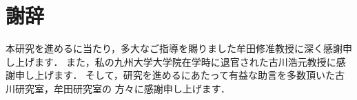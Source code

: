\chapter{謝辞}
本研究を進めるに当たり，多大なご指導を賜りました牟田修准教授に深く感謝申し上げます．
また，私の九州大学大学院在学時に退官された古川浩元教授に感謝申し上げます．
そして，研究を進めるにあたって有益な助言を多数頂いた古川研究室，牟田研究室の
方々に感謝申し上げます．